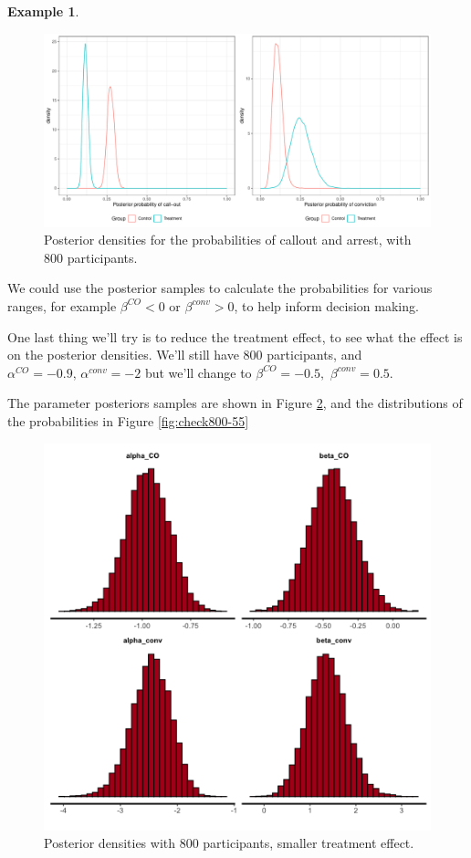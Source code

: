 \documentclass[
  openany]{book}
\theoremstyle{definition}
\theoremstyle{definition}
\newtheorem{example}{Example}[chapter]
\theoremstyle{definition}
\theoremstyle{definition}
\theoremstyle{remark}
\begin{document}
\begin{example}
\begin{figure}
\includegraphics[width=1\linewidth]{images/ggpost800} \caption{Posterior densities for the probabilities of callout and arrest, with 800 participants.}\label{fig:check800}
\end{figure}

We could use the posterior samples to calculate the probabilities for various ranges, for example \(\beta^{CO}<0\) or \(\beta^{conv}>0\), to help inform decision making.

One last thing we'll try is to reduce the treatment effect, to see what the effect is on the posterior densities. We'll still have 800 participants, and \(\alpha^{CO}=-0.9,\,\alpha^{conv}=-2\) but we'll change to \(\beta^{CO}=-0.5,\,\,\beta^{conv}=0.5\).

The parameter posteriors samples are shown in Figure \ref{fig:par800-55}, and the distributions of the probabilities in Figure \ref{fig:check800-55}

\begin{figure}
\centering
\includegraphics{images/ggpostparam800_55.png}
\caption{\label{fig:par800-55}Posterior densities with 800 participants, smaller treatment effect.}
\end{figure}


\end{example}
\end{document}
